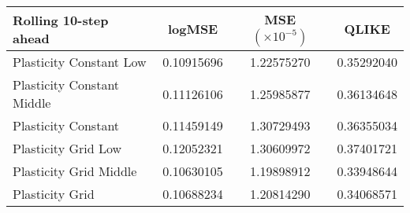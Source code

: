 
\begin{tabular}{l|c|c|c}
Rolling 10-step ahead     & logMSE & MSE $(\times 10^{-5})$ & QLIKE \\\hline
Plasticity Constant Low & 0.10915696 & 1.22575270 & 0.35292040\\ 
Plasticity Constant Middle & 0.11126106 & 1.25985877 & 0.36134648\\ 
Plasticity Constant & 0.11459149 & 1.30729493 & 0.36355034\\ 
Plasticity Grid Low & 0.12052321 & 1.30609972 & 0.37401721\\ 
Plasticity Grid Middle & 0.10630105 & 1.19898912 & 0.33948644\\ 
Plasticity Grid & 0.10688234 & 1.20814290 & 0.34068571\\ 
\end{tabular}